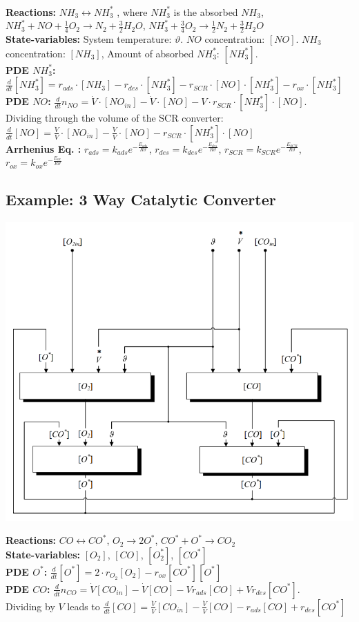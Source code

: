 \documentclass[10pt,a4paper]{scrartcl}
\begin{document}
\begin{multicols*}{3}
\begin{minipage}{0.6\columnwidth}
           \end{minipage} \\
\textbf{Reactions:} $NH_3\leftrightarrow NH_3^*$ , where $NH_3^*$ is the absorbed $NH_3$, $NH_3^*+NO+\frac{1}{4}O_2 \rightarrow N_2+\frac{3}{2}H_2O$, $NH_3^*+\frac{3}{4}O_2\rightarrow \frac{1}{2}N_2+\frac{3}{2}H_2O$\\
\textbf{State-variables:} System temperature: $\vartheta$. $NO$ concentration: $[NO]$. $NH_3$ concentration: $[NH_3]$, Amount of absorbed $NH_3^*$: $[NH_3^*]$.\\
\textbf{PDE $NH_3^*$:} $\frac{d}{dt}[NH_3^*]=r_{ads}\cdot [NH_3]-r_{des}\cdot [NH_3^*]-r_{SCR}\cdot [NO]\cdot [NH_3^*]-r_{ox}\cdot [NH_3^*]$\\
\textbf{PDE $NO$:} $\frac{d}{dt}n_{NO}=\dot{V}\cdot [NO_{in}]-\dot{V}\cdot [NO]-V\cdot r_{SCR}\cdot [NH_3^*]\cdot [NO]$.\\
Dividing through the volume of the SCR converter: $\frac{d}{dt}[NO]=\frac{\dot{V}}{V}\cdot [NO_{in}]-\frac{\dot{V}}{V}\cdot [NO]-r_{SCR}\cdot [NH_3^*]\cdot [NO]$\\
\textbf{Arrhenius Eq. :} $r_{ads}=k_{ads}e^{-\frac{E_{ads}}{R\vartheta}}$, $r_{des}=k_{des}e^{-\frac{E_{des}}{R\vartheta}}$, $r_{SCR}=k_{SCR}e^{-\frac{E_{SCR}}{R\vartheta}}$, $r_{ox}=k_{ox}e^{-\frac{E_{ox}}{R\vartheta}}$

\subsection{Example: 3 Way Catalytic Converter}

\includegraphics[width=0.75\columnwidth]{catal.png}

\textbf{Reactions:} $CO\leftrightarrow CO^*$, $O_2\rightarrow 2O^*$, $CO^*+O^*\rightarrow CO_2$\\
\textbf{State-variables:} $[O_2]$, $[CO]$, $[O_2^*]$, $[CO^*]$\\
\textbf{PDE $O^*$:} $\frac{d}{dt} [O^*]=2\cdot r_{O_2}[O_2]-r_{ox}[CO^*][O^*]$\\
\textbf{PDE $CO$:} $\frac{d}{dt}n_{CO}=\dot{V}[CO_{in}]-\dot{V}[CO]-Vr_{ads}[CO]+Vr_{des}[CO^*]$.\\
Dividing by $V$ leads to $\frac{d}{dt}[CO]=\frac{\dot{V}}{V}[CO_{in}]-\frac{\dot{V}}{V}[CO]-r_{ads}[CO]+r_{des}[CO^*]$
           

\end{multicols*}
\end{document}
